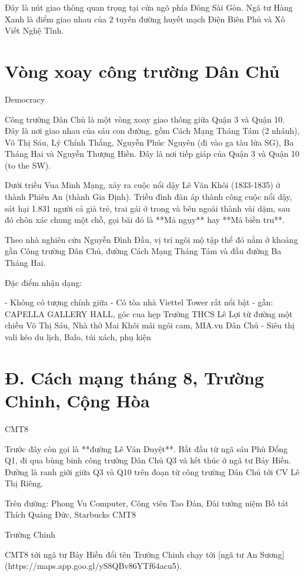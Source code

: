Đây là nút giao thông quan trọng tại cửa ngõ phía Đông Sài Gòn. Ngã tư Hàng Xanh là điểm giao nhau của 2 tuyến đường huyết mạch Điện Biên Phủ và Xô Viết Nghệ Tĩnh.

\section{Vòng xoay công trường Dân Chủ}

Democracy

 Công trường Dân Chủ là một vòng xoay giao thông giữa Quận 3 và Quận 10. Đây là nơi giao nhau của sáu con đường, gồm Cách Mạng Tháng Tám (2 nhánh), Võ Thị Sáu, Lý Chính Thắng, Nguyễn Phúc Nguyên (đi vào ga tàu lửa SG), Ba Tháng Hai và Nguyễn Thượng Hiền. Đây là nơi tiếp giáp của Quận 3 và Quận 10 (to the SW).

 Dưới triều Vua Minh Mạng, xảy ra cuộc nổi dậy Lê Văn Khôi (1833-1835) ở thành Phiên An (thành Gia Định). Triều đình đàn áp thành công cuộc nổi dậy, sát hại 1.831 người cả già trẻ, trai gái ở trong và bên ngoài thành vài dặm, sau đó chôn xác chung một chỗ, gọi bãi đó là **Mả ngụy** hay **Mả biền tru**.

Theo nhà nghiên cứu Nguyễn Đình Đầu, vị trí ngôi mộ tập thể đó nằm ở khoảng gần Công trường Dân Chủ, đường Cách Mạng Tháng Tám và đầu đường Ba Tháng Hai.

Đặc điểm nhận dạng:

- Không có tượng chính giữa
- Có tòa nhà Viettel Tower rất nổi bật
- gần: CAPELLA GALLERY HALL, góc cua hẹp Trường THCS Lê Lợi từ đường một chiều Võ Thị Sáu, Nhà thờ Mai Khôi mái ngói cam, MIA.vn Dân Chủ - Siêu thị vali kéo du lịch, Balo, túi xách, phụ kiện

\section{Đ. Cách mạng tháng 8, Trường Chinh, Cộng Hòa}

CMT8

Trước đây còn gọi là **đường Lê Văn Duyệt**. Bắt đầu từ ngã sáu Phù Đổng Q1, đi qua bùng binh công trường Dân Chủ Q3 và kết thúc ở ngã tư Bảy Hiền. Đường là ranh giới giữa Q3 và Q10 trên đoạn từ công trường Dân Chủ tới CV Lê Thị Riêng.

Trên đường: Phong Vu Computer, Công viên Tao Đàn, Đài tưởng niệm Bồ tát Thích Quảng Đức, Starbucks CMT8

Trường Chinh

CMT8 tới ngã tư Bảy Hiền đổi tên Trường Chinh chạy tới [ngã tư An Sương](https://maps.app.goo.gl/yS8QBv86YTf64acu5).

